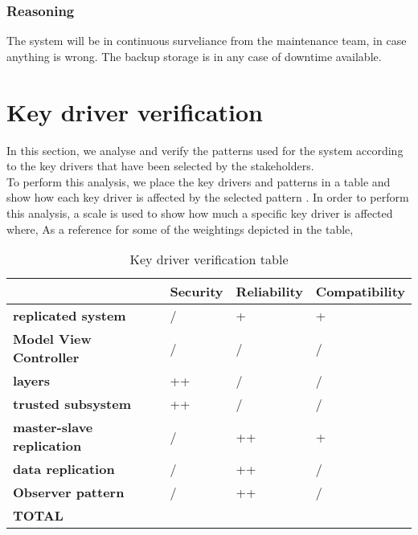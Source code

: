 \subsubsection{Reasoning}

The system will be in continuous surveliance from the maintenance team, in case anything is wrong. The backup storage is in any case of downtime available. 
\newpage


\section{Key driver verification}
In this section, we analyse and verify the patterns used for the system according to the key drivers that have been selected by the stakeholders.\\
To perform this analysis, we place the key drivers and patterns in a table and show how each key driver is affected by the selected pattern \cite{web:patterns-v-QAs} . In order to perform this analysis, a scale is used to show how much a specific key driver is affected where,
As a reference for some of the weightings depicted in the table, 

\begin{table}[H]
    \begin{tabularx}{\textwidth}{p{3.5cm}|>{\centering\arraybackslash}X|>{\centering\arraybackslash}X|>{\centering\arraybackslash}X}
    	 & \textbf{Security} & \textbf{Reliability} & \textbf{Compatibility} \\ \hline
    	\textbf{replicated system}         & /  & +  & + \\ \hline
    	\textbf{Model View Controller}  & /  & / & /  \\ \hline
    	\textbf{layers}                    & ++ & /  &  / \\ \hline
    	\textbf{trusted subsystem}         & ++ & /  &  / \\ \hline
    	\textbf{master-slave replication}  & /  & ++ & +  \\ \hline
	\textbf{data replication}  &  / & ++ & /  \\ \hline
	\textbf{Observer pattern}  &  / & ++ &  / \\ \hline
	 \textbf{TOTAL} & \textbf{} & \textbf{} & \textbf{} \\
    \end{tabularx}
    \caption{Key driver verification table}
\end{table}